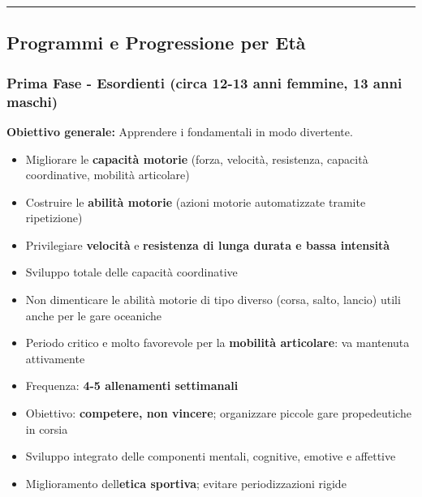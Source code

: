 \documentclass[a4paper,11pt]{article}
\providecommand{\tightlist}{%
  \setlength{\itemsep}{0pt}\setlength{\parskip}{0pt}}
\begin{document}
\begin{center}\rule{0.5\linewidth}{0.5pt}\end{center}

\subsection{Programmi e Progressione per
      Età}\label{programmi-e-progressione-per-etuxe0}

\subsubsection{Prima Fase - Esordienti (circa 12-13 anni femmine, 13
      anni
      maschi)}\label{prima-fase---esordienti-circa-12-13-anni-femmine-13-anni-maschi}

\textbf{Obiettivo generale:} Apprendere i fondamentali in modo
divertente.

\begin{itemize}
      \tightlist
      \item
            Migliorare le \textbf{capacità motorie} (forza, velocità, resistenza,
            capacità coordinative, mobilità articolare)
      \item
            Costruire le \textbf{abilità motorie} (azioni motorie automatizzate
            tramite ripetizione)
      \item
            Privilegiare \textbf{velocità} e \textbf{resistenza di lunga durata e
                  bassa intensità}
      \item
            Sviluppo totale delle capacità coordinative
      \item
            Non dimenticare le abilità motorie di tipo diverso (corsa, salto,
            lancio) utili anche per le gare oceaniche
      \item
            Periodo critico e molto favorevole per la \textbf{mobilità
                  articolare}: va mantenuta attivamente
      \item
            Frequenza: \textbf{4-5 allenamenti settimanali}
      \item
            Obiettivo: \textbf{competere, non vincere}; organizzare piccole gare
            propedeutiche in corsia
      \item
            Sviluppo integrato delle componenti mentali, cognitive, emotive e
            affettive
      \item
            Miglioramento dell\textquotesingle{}\textbf{etica sportiva}; evitare
            periodizzazioni rigide
\end{itemize}
\end{document}
